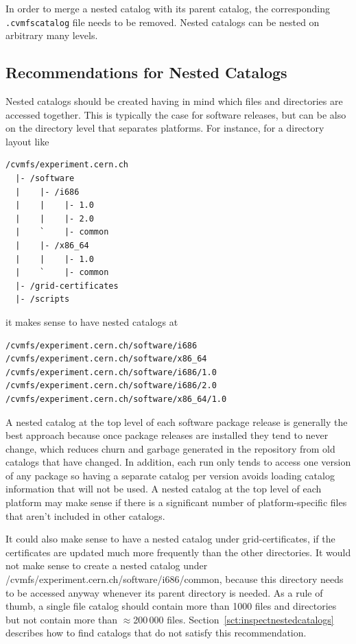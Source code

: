 In order to merge a nested catalog with its parent catalog, the corresponding \texttt{.cvmfscatalog} file needs to be removed.
Nested catalogs can be nested on arbitrary many levels.

\subsection{Recommendations for Nested Catalogs}
\label{sct:nestedcatalogrecommendations}
Nested catalogs should be created having in mind which files and directories are accessed together.
This is typically the case for software releases, but can be also on the directory level that separates platforms.
For instance, for a directory layout like
\begin{verbatim}
/cvmfs/experiment.cern.ch
  |- /software
  |    |- /i686
  |    |    |- 1.0
  |    |    |- 2.0
  |    `    |- common
  |    |- /x86_64
  |    |    |- 1.0
  |    `    |- common
  |- /grid-certificates
  |- /scripts
\end{verbatim}
it makes sense to have nested catalogs at
\begin{verbatim}
/cvmfs/experiment.cern.ch/software/i686
/cvmfs/experiment.cern.ch/software/x86_64
/cvmfs/experiment.cern.ch/software/i686/1.0
/cvmfs/experiment.cern.ch/software/i686/2.0
/cvmfs/experiment.cern.ch/software/x86_64/1.0
\end{verbatim}

A nested catalog at the top level of each software package release is generally the best approach because once package releases are installed they tend to never change, which reduces churn and garbage generated in the repository from old catalogs that have changed.
In addition, each run only tends to access one version of any package so having a separate catalog per version avoids loading catalog information that will not be used.
A nested catalog at the top level of each platform may make sense if there is a significant number of platform-specific files that aren't included in other catalogs.

It could also make sense to have a nested catalog under grid-certificates, if the certificates are updated much more frequently than the other directories.
It would not make sense to create a nested catalog under /cvmfs/experiment.cern.ch/software/i686/common, because this directory needs to be accessed anyway whenever its parent directory is needed.
As a rule of thumb, a single file catalog should contain more than 1000 files and directories but not contain more than $\approx$200\,000 files.
Section~\ref{sct:inspectnestedcatalogs} describes how to find catalogs that do not satisfy this recommendation.


